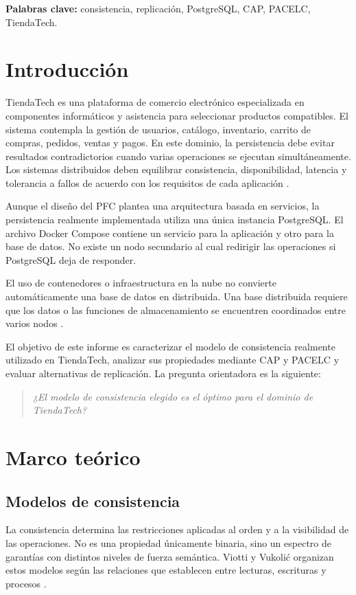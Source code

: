 \documentclass[11pt,a4paper]{article}
\begin{document}
\vspace{0.3cm}
\noindent\textbf{Palabras clave:} consistencia, replicación, PostgreSQL, CAP, PACELC, TiendaTech.

\newpage
\tableofcontents
\newpage

\section{Introducción}
TiendaTech es una plataforma de comercio electrónico especializada en componentes informáticos y asistencia para seleccionar productos compatibles. El sistema contempla la gestión de usuarios, catálogo, inventario, carrito de compras, pedidos, ventas y pagos. En este dominio, la persistencia debe evitar resultados contradictorios cuando varias operaciones se ejecutan simultáneamente. Los sistemas distribuidos deben equilibrar consistencia, disponibilidad, latencia y tolerancia a fallos de acuerdo con los requisitos de cada aplicación \cite{margara2023}.

Aunque el diseño del PFC plantea una arquitectura basada en servicios, la persistencia realmente implementada utiliza una única instancia PostgreSQL. El archivo Docker Compose contiene un servicio para la aplicación y otro para la base de datos. No existe un nodo secundario al cual redirigir las operaciones si PostgreSQL deja de responder.

El uso de contenedores o infraestructura en la nube no convierte automáticamente una base de datos en distribuida. Una base distribuida requiere que los datos o las funciones de almacenamiento se encuentren coordinados entre varios nodos \cite{margara2023}.

El objetivo de este informe es caracterizar el modelo de consistencia realmente utilizado en TiendaTech, analizar sus propiedades mediante CAP y PACELC y evaluar alternativas de replicación. La pregunta orientadora es la siguiente:

\begin{quote}
\textit{¿El modelo de consistencia elegido es el óptimo para el dominio de TiendaTech?}
\end{quote}

\section{Marco teórico}

\subsection{Modelos de consistencia}
La consistencia determina las restricciones aplicadas al orden y a la visibilidad de las operaciones. No es una propiedad únicamente binaria, sino un espectro de garantías con distintos niveles de fuerza semántica. Viotti y Vukolić organizan estos modelos según las relaciones que establecen entre lecturas, escrituras y procesos \cite{viotti2016}.
\end{document}
